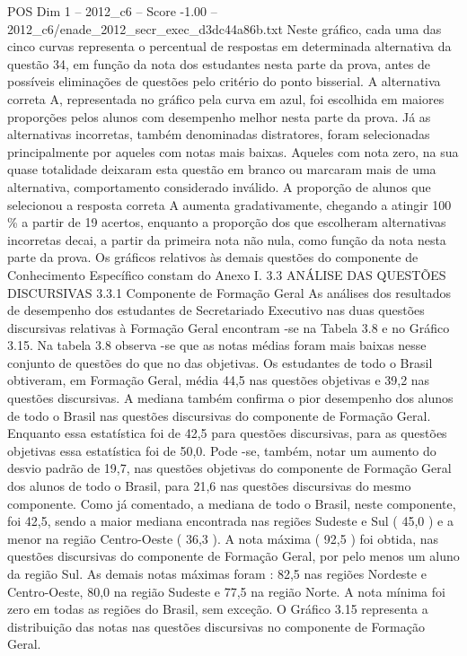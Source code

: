 \begin{textsample}{POS Dim 1 – 2012\_c6 – Score -1.00 – 2012\_c6/enade\_2012\_secr\_exec\_d3dc44a86b.txt}
Neste gráfico, cada uma das cinco curvas representa o percentual de respostas em determinada alternativa da questão 34, em função da nota dos estudantes nesta parte da prova, antes de possíveis eliminações de questões pelo critério do ponto bisserial.
A alternativa correta A, representada no gráfico pela curva em azul, foi escolhida em maiores proporções pelos alunos com desempenho melhor nesta parte da prova.
Já as alternativas incorretas, também denominadas distratores, foram selecionadas principalmente por aqueles com notas mais baixas.
Aqueles com nota zero, na sua quase totalidade deixaram esta questão em branco ou marcaram mais de uma alternativa, comportamento considerado inválido.
A proporção de alunos que selecionou a resposta correta A aumenta gradativamente, chegando a atingir 100 \% a partir de 19 acertos, enquanto a proporção dos que escolheram alternativas incorretas decai, a partir da primeira nota não nula, como função da nota nesta parte da prova.
Os gráficos relativos às demais questões do componente de Conhecimento Específico constam do Anexo I. 3.3 ANÁLISE DAS QUESTÕES DISCURSIVAS 3.3.1 Componente de Formação Geral As análises dos resultados de desempenho dos estudantes de Secretariado Executivo nas duas questões discursivas relativas à Formação Geral encontram -se na Tabela 3.8 e no Gráfico 3.15.
Na tabela 3.8 observa -se que as notas médias foram mais baixas nesse conjunto de questões do que no das objetivas.
Os estudantes de todo o Brasil obtiveram, em Formação Geral, média 44,5 nas questões objetivas e 39,2 nas questões discursivas.
A mediana também confirma o pior desempenho dos alunos de todo o Brasil nas questões discursivas do componente de Formação Geral.
Enquanto essa estatística foi de 42,5 para questões discursivas, para as questões objetivas essa estatística foi de 50,0.
Pode -se, também, notar um aumento do desvio padrão de 19,7, nas questões objetivas do componente de Formação Geral dos alunos de todo o Brasil, para 21,6 nas questões discursivas do mesmo componente.
Como já comentado, a mediana de todo o Brasil, neste componente, foi 42,5, sendo a maior mediana encontrada nas regiões Sudeste e Sul ( 45,0 ) e a menor na região Centro-Oeste ( 36,3 ).
A nota máxima ( 92,5 ) foi obtida, nas questões discursivas do componente de Formação Geral, por pelo menos um aluno da região Sul.
As demais notas máximas foram : 82,5 nas regiões Nordeste e Centro-Oeste, 80,0 na região Sudeste e 77,5 na região Norte.
A nota mínima foi zero em todas as regiões do Brasil, sem exceção.
O Gráfico 3.15 representa a distribuição das notas nas questões discursivas no componente de Formação Geral.

\end{textsample}
